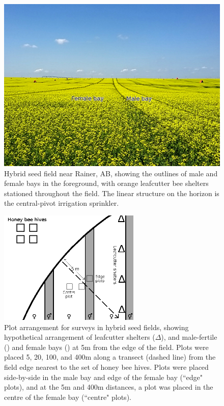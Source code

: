 \begin{figure}
    \centering
    \includegraphics[width=\textwidth,keepaspectratio=true]{seedfieldBays.jpg}
    \caption[Hybrid seed field near Rainer, AB]{Hybrid seed field near Rainer, AB, showing the outlines of male and female bays in the foreground, with orange leafcutter bee shelters stationed throughout the field. The linear structure on the horizon is the central-pivot irrigation sprinkler.}
    \label{fig:seedfieldPhoto}
\end{figure}

\begin{figure}
    \centering
    \includegraphics[width=0.6\textwidth,keepaspectratio=true]{seedfieldPlots.png}
    \caption[Plot arrangement for surveys in hybrid seed fields]{Plot arrangement for surveys in hybrid seed fields, showing hypothetical arrangement of leafcutter shelters ($\Delta$), and male-fertile (\Hermaphrodite) and female bays (\Female) at 5m from the edge of the field. Plots were placed 5, 20, 100, and 400m along a transect (dashed line) from the field edge nearest to the set of honey bee hives. Plots were placed side-by-side in the male bay and edge of the female bay (``edge" plots), and at the 5m and 400m distances, a plot was placed in the centre of the female bay (``centre" plots).}
    \label{fig:seedfieldPlots}
\end{figure}

